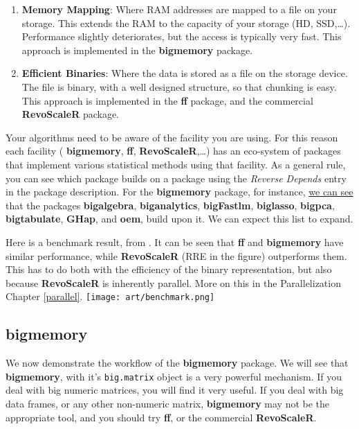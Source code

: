 \documentclass[]{book}
\theoremstyle{definition}
\theoremstyle{definition}
\theoremstyle{definition}
\theoremstyle{remark}
\begin{document}
\begin{enumerate}
\def\labelenumi{\arabic{enumi}.}
\item
  \textbf{Memory Mapping}: Where RAM addresses are mapped to a file on
  your storage. This extends the RAM to the capacity of your storage
  (HD, SSD,\ldots{}). Performance slightly deteriorates, but the access
  is typically very fast. This approach is implemented in the
  \textbf{bigmemory} package.
\item
  \textbf{Efficient Binaries}: Where the data is stored as a file on the
  storage device. The file is binary, with a well designed structure, so
  that chunking is easy. This approach is implemented in the \textbf{ff}
  package, and the commercial \textbf{RevoScaleR} package.
\end{enumerate}

Your algorithms need to be aware of the facility you are using. For this
reason each facility ( \textbf{bigmemory}, \textbf{ff},
\textbf{RevoScaleR},\ldots{}) has an eco-system of packages that
implement various statistical methods using that facility. As a general
rule, you can see which package builds on a package using the
\emph{Reverse Depends} entry in the package description. For the
\textbf{bigmemory} package, for instance,
\href{https://cran.r-project.org/web/packages/bigmemory/index.html}{we
can see} that the packages \textbf{bigalgebra}, \textbf{biganalytics},
\textbf{bigFastlm}, \textbf{biglasso}, \textbf{bigpca},
\textbf{bigtabulate}, \textbf{GHap}, and \textbf{oem}, build upon it. We
can expect this list to expand.

Here is a benchmark result, from \citet{wang2015statistical}. It can be
seen that \textbf{ff} and \textbf{bigmemory} have similar performance,
while \textbf{RevoScaleR} (RRE in the figure) outperforms them. This has
to do both with the efficiency of the binary representation, but also
because \textbf{RevoScaleR} is inherently parallel. More on this in the
Parallelization Chapter \ref{parallel}.
\texttt{[image: art/benchmark.png]}

\subsection{bigmemory}\label{bigmemory}

We now demonstrate the workflow of the \textbf{bigmemory} package. We
will see that \textbf{bigmemory}, with it's \texttt{big.matrix} object
is a very powerful mechanism. If you deal with big numeric matrices, you
will find it very useful. If you deal with big data frames, or any other
non-numeric matrix, \textbf{bigmemory} may not be the appropriate tool,
and you should try \textbf{ff}, or the commercial \textbf{RevoScaleR}.
\end{document}
